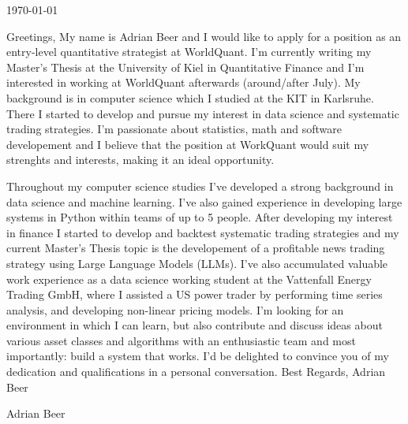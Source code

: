 \documentclass{ExpressiveCoverLetter}
\begin{document}
\coverletterheader[
    firstname=Adrian,
    lastname=Beer,
    email=adrianbeerka@gmail.com,
    phone=+49 1575 6642668,
    city=Kiel,
    state=Germany
]

\vspace{0.25in}
\today
\vspace{0.15in}


Greetings,
My name is Adrian Beer and I would like to apply for a position as an entry-level quantitative strategist at WorldQuant. 
I'm currently writing my Master's Thesis at the University of Kiel in Quantitative Finance and I'm interested in working at WorldQuant afterwards (around/after July). 
My background is in computer science which I studied at the KIT in Karlsruhe. 
There I started to develop and pursue my interest in data science and systematic trading strategies. 
I'm passionate about statistics, math and software developement and I believe that the position at WorkQuant would suit my strenghts and interests, making it an ideal opportunity.

Throughout my computer science studies I've developed a strong background in data science and machine learning. 
I've also gained experience in developing large systems in Python within teams of up to 5 people. 
After developing my interest in finance I started to develop and backtest systematic trading strategies and my current Master's Thesis topic is the developement of a profitable news trading strategy using Large Language Models (LLMs). 
I've also accumulated valuable work experience as a data science working student at the Vattenfall Energy Trading GmbH, where I assisted a US power trader by performing time series analysis, and developing non-linear pricing models.
I'm looking for an environment in which I can learn, but also contribute and discuss ideas about various asset classes and algorithms with an enthusiastic team and most importantly: build a system that works.
I'd be delighted to convince you of my dedication and qualifications in a personal conversation.
Best Regards,
Adrian Beer


\vspace{.15in}

Adrian Beer
\end{document}
